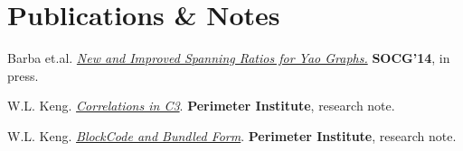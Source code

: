 \documentclass{deedy-resume-openfont}
\begin{document}
\begin{minipage}[t]{0.66\textwidth}

\section{Publications \& Notes} 
\begin{enumerate}[ {[}1{]} ]
\setlength{\itemsep}{0pt}
\setlength{\parskip}{0pt}

\item Barba et.al. \href{http://arxiv.org/pdf/1307.5829.pdf}{\em New and Improved Spanning Ratios for Yao Graphs.} {\bf SOCG'14}, in press.

\item W.L. Keng. \href{https://github.com/kengz/Quantum-Foundations-Correlations/blob/master/Keng%20Correlations%20in%20C3.pdf}{\em Correlations in C3}. {\bf Perimeter Institute}, research note.

\item W.L. Keng. \href{https://github.com/kengz/Quantum-Foundations-Correlations/blob/master/Keng%20blockcode.pdf}{\em BlockCode and Bundled Form}. {\bf Perimeter Institute}, research note.
\end{enumerate}



\renewcommand\refname{\vskip -1.5cm} %


\nocite{*}

\end{minipage} 
\end{document}
